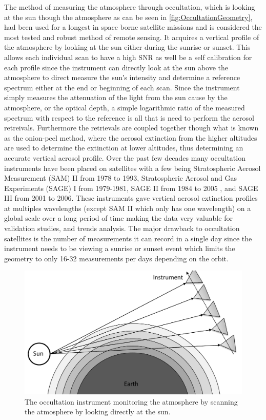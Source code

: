 The method of measuring the atmosphere through occultation, which is looking at the sun though the atmosphere as can be seen in \autoref{fig:OccultationGeometry}, had been used for a longest in space borne satellite missions and is considered the most tested and robust method of remote sensing. It acquires a vertical profile of the atmosphere by looking at the sun either during the sunrise or sunset. This allows each individual scan to have a high SNR as well be a self calibration for each profile since the instrument can directly look at the sun above the atmosphere to direct measure the sun\si{\arcminute}s intensity and determine a reference spectrum either at the end or beginning of each scan. Since the instrument simply measures the attenuation of the light from the sun cause by the atmosphere, or the optical depth, a simple logarithmic ratio of the measured spectrum with respect to the reference is all that is need to perform the aerosol retreivals. Furthermore the retrievals are coupled together though what is known as the onion-peel method, where the aerosol extinction from the higher altitudes are used to determine the extinction at lower altitudes, thus determining an accurate vertical aerosol profile. Over the past few decades many occultation instruments have been placed on satellites with a few being Stratospheric Aerosol Measurement (SAM) II from 1978 to 1993, Stratospheric Aerosol and Gas Experiments (SAGE) I \citep{McCormick1979} from 1979-1981, SAGE II \citep{McCormick1987} from 1984 to 2005 , and SAGE III \citep{Thomason2003} from 2001 to 2006. These instruments gave vertical aerosol extinction profiles at multiples wavelengths (except SAM II which only has one wavelength) on a global scale over a long period of time making the data very valuable for validation studies, and trends analysis. The major drawback to occultation satellites is the number of measurements it can record in a single day since the instrument needs to be viewing a sunrise or sunset event which limits the geometry to only 16-32 measurements per days depending on the orbit.

\begin{figure}[h]
    \includegraphics[width=1.0\textwidth]{./Images/OccultationGeometry.pdf}
    \caption[Occultation Geometry]{The occultation instrument monitoring the atmosphere by scanning the atmosphere by looking directly at the sun.}
    \label{fig:OccultationGeometry}
\end{figure}

